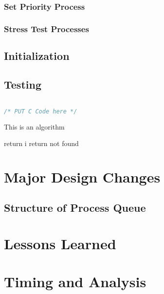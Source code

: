 \documentclass[12pt]{report}
\begin{document}
\subsection{Set Priority Process}

\subsection{Stress Test Processes}





\section{Initialization}





\section{Testing}




\begin{minipage}{\textwidth}
\begin{lstlisting}[language=C, frame=single]

/* PUT C Code here */

\end{lstlisting}
\end{minipage}

\begin{algorithm}
  \caption{This is an algorithm}
  \begin{algorithmic}[1]
          \State return i
        \EndIf
      \EndFor
    \State return not found
    \EndFunction
  \end{algorithmic}
\end{algorithm}

\chapter{Major Design Changes}

\section{Structure of Process Queue}



\chapter{Lessons Learned}




\chapter{Timing and Analysis}
\end{document}
